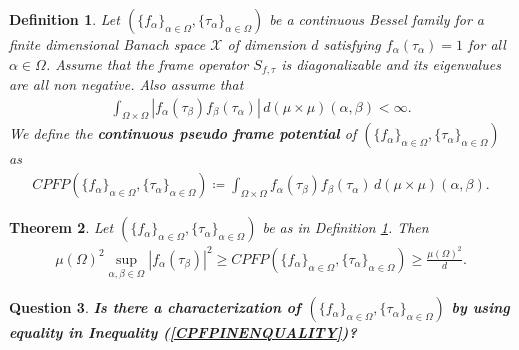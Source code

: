 \documentclass{amsart}
\newtheorem{theorem}{Theorem}[section]
\newtheorem{definition}[theorem]{Definition}
\newtheorem{question}[theorem]{Question}
\begin{document}
 \begin{definition}\label{CPFP}
 	 Let  $ (\{f_\alpha\}_{\alpha\in \Omega}, \{\tau_\alpha\}_{\alpha\in \Omega})$ be a 	 continuous Bessel  family for  a finite dimensional Banach space $\mathcal{X}$ of dimension $d$   satisfying  $f_\alpha(\tau_\alpha)=1$ for all $\alpha \in \Omega$. Assume that  the  frame operator 
 	$	S_{f, \tau}$  is diagonalizable and its eigenvalues are all non negative. Also assume that 
 	\begin{align*}
 		\int_{\Omega\times\Omega}|f_\alpha(\tau_\beta)f_\beta(\tau_\alpha)|\, d(\mu\times\mu)(\alpha,\beta)<\infty.
 	\end{align*}  We define the \textbf{continuous pseudo frame potential} of $  (\{f_\alpha\}_{\alpha\in \Omega}, \{\tau_\alpha\}_{\alpha\in \Omega}) $ as 
 	\begin{align*}
 		CPFP  (\{f_\alpha\}_{\alpha\in \Omega}, \{\tau_\alpha\}_{\alpha\in \Omega})\coloneqq  	\int_{\Omega\times\Omega}f_\alpha(\tau_\beta)f_\beta(\tau_\alpha)\, d(\mu\times\mu)(\alpha,\beta).
 	\end{align*}
 \end{definition}
\begin{theorem}\label{CPFPTHEOREM}
 	Let $ (\{f_\alpha\}_{\alpha\in \Omega}, \{\tau_\alpha\}_{\alpha\in \Omega})$ be as in Definition \ref{CPFP}. Then 	
 	\begin{align}\label{CPFPINENQUALITY}
 		\mu(\Omega)^2	\sup_{\alpha, \beta \in \Omega}|f_\alpha(\tau_\beta)| ^2\geq 	CPFP (\{f_\alpha\}_{\alpha\in \Omega}, \{\tau_\alpha\}_{\alpha\in \Omega})	\geq 		\frac{\mu(\Omega)^2}{d}.
 	\end{align}
 \end{theorem}
 
 \begin{question}
 	\textbf{Is  there  a characterization of $ (\{f_\alpha\}_{\alpha\in \Omega}, \{\tau_\alpha\}_{\alpha\in \Omega}) $ by using equality in Inequality (\ref{CPFPINENQUALITY})?}
 \end{question}
 
 
 
 
 
 
 
 

 
\end{document}
